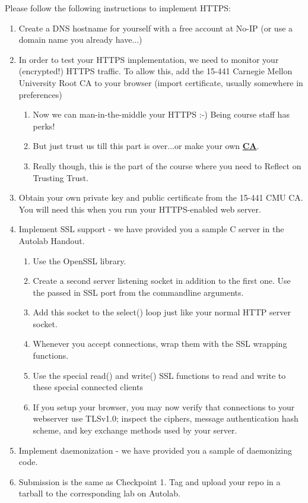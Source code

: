 Please follow the following instructions to implement HTTPS:
\begin{enumerate}
\item Create a DNS hostname for yourself with a free account at No-IP \cite{WWW:no-ip} (or use a domain name you already have...)
\item In order to test your HTTPS implementation, we need to monitor your (encrypted!) HTTPS traffic.  To allow this, add the 15-441 Carnegie Mellon University Root CA to your browser (import certificate, usually somewhere in preferences)
\begin{enumerate}
    \item Now we can man-in-the-middle your HTTPS :-) Being course staff has perks!
    \item But just trust us till this part is over...or make your own \textbf{\href{http://www.g-loaded.eu/2005/11/10/be-your-own-ca/}{CA}}.
    \item Really though, this is the part of the course where you need to Reflect on Trusting Trust.
\end{enumerate}
\item Obtain your own private key and public certificate from the 15-441 CMU CA.  You will need this when you run your HTTPS-enabled web server.
\item Implement SSL support - we have provided you a sample C server in the Autolab Handout. 
\begin{enumerate}
    \item Use the OpenSSL library. \cite{www:openssl}
    \item Create a second server listening socket in addition to the first one. Use the passed in SSL port from the commandline arguments.
    \item Add this socket to the select() loop just like your normal HTTP server socket.
    \item Whenever you accept connections, wrap them with the SSL wrapping functions.
    \item Use the special read() and write() SSL functions to read and write to these special connected clients
    \item If you setup your browser, you may now verify that connections to your webserver use TLSv1.0; inspect the ciphers, message authentication hash scheme, and key exchange methods used by your server.
\end{enumerate}
\item Implement daemonization - we have provided you a sample of daemonizing code.
\item Submission is the same as Checkpoint 1. Tag and upload your repo in a tarball to the corresponding lab on Autolab.
\end{enumerate}

